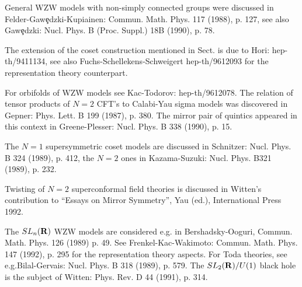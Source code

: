 General WZW models with non-simply connected groups
were discussed in Felder-Gaw\c{e}dzki-Kupiainen: Commun. Math. Phys.
117 (1988), p. 127, \m see also Gaw\c{e}dzki: Nucl. Phys. B (Proc. Suppl.)
18B (1990), p. 78.
\vskip 0.3cm

The extension of the coset construction mentioned in Sect.\s{}
is due to Hori: hep-th/9411134, see also
Fuchs-Schellekens-Schweigert
hep-th/9612093 for the representation theory counterpart.
\vskip 0.3cm

For orbifolds of WZW models see Kac-Todorov: hep-th/9612078.
The relation of tensor products of $N=2$
CFT's to Calabi-Yau sigma models was
discovered in Gepner: Phys. Lett. B 199 (1987), p. 380.
The mirror pair of quintics appeared in this context in
Greene-Plesser: Nucl. Phys. B 338 (1990), p. 15.
\vskip 0.3cm

The $N=1$ supersymmetric coset models are discussed in
Schnitzer: Nucl. Phys. B 324 (1989), p. 412, \m the
$N=2$ ones in Kazama-Suzuki: Nucl. Phys. B321 (1989), p. 232.
\vskip 0.3cm

Twisting of $N=2$ superconformal field theories is discussed
in Witten's contribution to ``Essays on Mirror Symmetry'',
Yau (ed.), International Press 1992.
\vskip 0.3cm

The  $SL_n({{\bf R}})$ WZW models are considered e.g.
in Bershadsky-Ooguri, Commun. Math. Phys. 126 (1989) p. 49.
See Frenkel-Kac-Wakimoto: Commun. Math. Phys. 147 (1992), p. 295
for the representation theory aspects. For Toda theories,
see e.g.\s\s Bilal-Gervais: Nucl. Phys. B 318
(1989), p. 579. The $SL_2({{\bf R}})/U(1)$ black hole
is the subject of Witten: Phys. Rev. D 44 (1991), p. 314.



